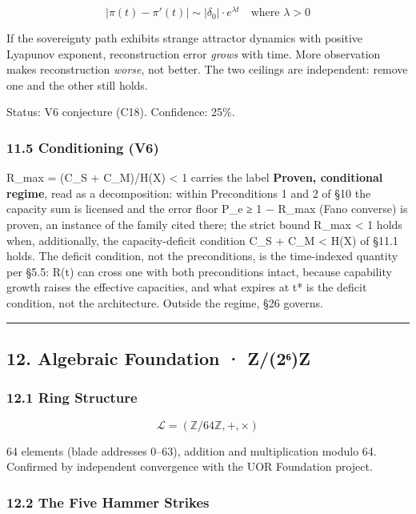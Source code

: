\documentclass[
  11pt,
]{article}
\begin{document}
\[|\pi(t) - \pi'(t)| \sim |\delta_0| \cdot e^{\lambda t} \quad \text{where } \lambda > 0\]

If the sovereignty path exhibits strange attractor dynamics with
positive Lyapunov exponent, reconstruction error \emph{grows} with time.
More observation makes reconstruction \emph{worse}, not better. The two
ceilings are independent: remove one and the other still holds.

Status: V6 conjecture (C18). Confidence: 25\%.

\subsubsection{11.5 Conditioning (V6)}\label{conditioning-v6}

R\_max = (C\_S + C\_M)/H(X) \textless{} 1 carries the label
\textbf{Proven, conditional regime}, read as a decomposition: within
Preconditions 1 and 2 of §10 the capacity sum is licensed and the error
floor P\_e ≥ 1 − R\_max (Fano converse) is proven, an instance of the
family cited there; the strict bound R\_max \textless{} 1 holds when,
additionally, the capacity-deficit condition C\_S + C\_M \textless{}
H(X) of §11.1 holds. The deficit condition, not the preconditions, is
the time-indexed quantity per §5.5: R(t) can cross one with both
preconditions intact, because capability growth raises the effective
capacities, and what expires at t* is the deficit condition, not the
architecture. Outside the regime, §26 governs.

\begin{center}\rule{0.5\linewidth}{0.5pt}\end{center}

\subsection{12. Algebraic Foundation ·
Z/(2⁶)Z}\label{algebraic-foundation-z2ux2076z}

\subsubsection{12.1 Ring Structure}\label{ring-structure}

\[\mathcal{L} = (\mathbb{Z}/64\mathbb{Z}, +, \times)\]

64 elements (blade addresses 0--63), addition and multiplication modulo
64. Confirmed by independent convergence with the UOR Foundation
project.

\subsubsection{12.2 The Five Hammer
Strikes}\label{the-five-hammer-strikes}
\end{document}

